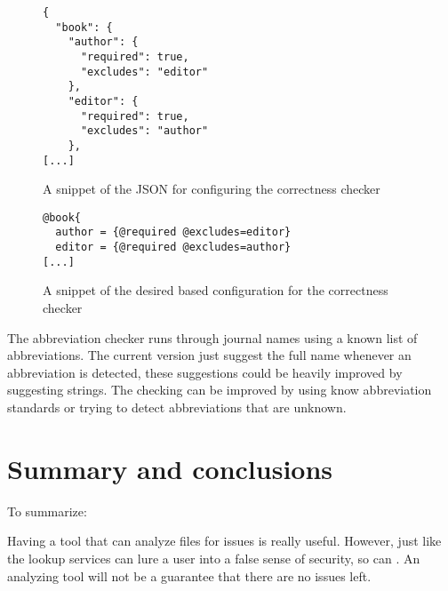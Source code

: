 \begin{figure}
  \centering
\begin{verbatim}
{
  "book": {
    "author": {
      "required": true,
      "excludes": "editor"
    },
    "editor": {
      "required": true,
      "excludes": "author"
    },
[...]
\end{verbatim}
  \caption{A snippet of the JSON for configuring the correctness checker}
  \label{fig:correctness_checker_json}
\end{figure}

\begin{figure}
  \centering
\begin{verbatim}
@book{
  author = {@required @excludes=editor}
  editor = {@required @excludes=author}
[...]
\end{verbatim}
  \caption{A snippet of the desired {\bibtex} based configuration for the correctness checker}
  \label{fig:correctness_checker_bibtex}
\end{figure}

The abbreviation checker runs through journal names using a known list
of abbreviations.  The current version just suggest the full name
whenever an abbreviation is detected, these suggestions could be
heavily improved by suggesting strings.  The checking can be improved
by using know abbreviation standards or trying to detect abbreviations
that are unknown.



\section{Summary and conclusions}

To summarize:

Having a tool that can analyze {\bibtex} files for issues is really
useful.  However, just like the lookup services can lure a user into
a false sense of security, so can \orangutan.  An analyzing tool will
not be a guarantee that there are no issues left.
